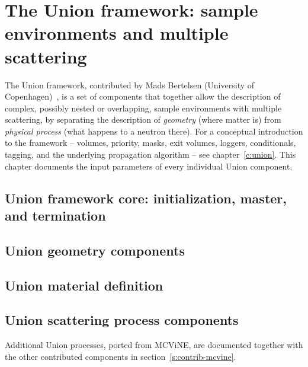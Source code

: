 
\chapter{The Union framework: sample environments and multiple scattering}
\label{c:union-comp}

The Union framework, contributed by Mads Bertelsen (University of
Copenhagen)~\cite{union_thesis,union_paper}, is a set of components that together allow the description of
complex, possibly nested or overlapping, sample environments with multiple
scattering, by separating the description of \emph{geometry} (where matter
is) from \emph{physical process} (what happens to a neutron there). For a
conceptual introduction to the framework -- volumes, priority, masks, exit
volumes, loggers, conditionals, tagging, and the underlying propagation
algorithm -- see chapter~\ref{c:union}. This chapter documents the input
parameters of every individual Union component.

\section{Union framework core: initialization, master, and termination}





\section{Union geometry components}






\section{Union material definition}



\section{Union scattering process components}

Additional Union processes, ported from MCViNE, are documented together with the
other contributed components in section~\ref{s:contrib-mcvine}.


